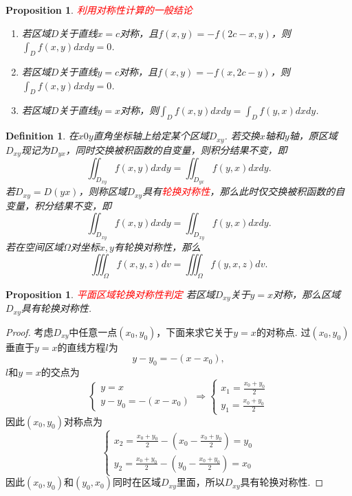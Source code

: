 \documentclass{article}
\newtheorem{proposition}[theorem]{Proposition}
\newtheorem{definition}[theorem]{Definition}
\newcommand{\redt}[1]{\textcolor{red}{#1}}
\begin{document}
\begin{proposition}
\rm \redt{利用对称性计算的一般结论} 
\begin{enumerate}
	\item 若区域$D$关于直线$x = c$对称，且$f(x,y) = -f(2c-x,y)$，则$\int_D f(x,y)dxdy = 0$.
	\item 若区域$D$关于直线$y = c$对称，且$f(x,y) = -f(x,2c-y)$，则$\int_D f(x,y)dxdy = 0$.
	\item 若区域$D$关于直线$y = x$对称，则$\int_D f(x,y)dxdy = \int_D f(y,x)dxdy$.
\end{enumerate}
\end{proposition}

\begin{definition}
\rm 在$x0y$直角坐标轴上给定某个区域$D_{xy}$. 若交换$x$轴和$y$轴，原区域$D_{xy}$现记为$D_{yx}$，同时交换被积函数的自变量，则积分结果不变，即
$$
\iint_{D_{xy}} f(x,y)dxdy = \iint_{D_{yx}} f(y,x)dxdy.
$$ 
若$D_{xy} = D(yx)$，则称区域$D_{xy}$具有\redt{轮换对称性}，那么此时仅交换被积函数的自变量，积分结果不变，即
$$
\iint_{D_{xy}} f(x,y)dxdy = \iint_{D_{xy}} f(y,x)dxdy.
$$
若在空间区域$\Omega$对坐标$x,y$有轮换对称性，那么
$$
\iiint_\Omega f(x,y,z)dv = \iiint_\Omega f(y,x,z)dv.
$$
\end{definition}

\begin{proposition}
\rm \redt{平面区域轮换对称性判定} 若区域$D_{xy}$关于$y = x$对称，那么区域$D_{xy}$具有轮换对称性.
\end{proposition}

\begin{proof}
\rm 考虑$D_{xy}$中任意一点$(x_0,y_0)$，下面来求它关于$y=x$的对称点. 过$(x_0,y_0)$垂直于$y=x$的直线方程$l$为
$$
y-y_0 = -(x-x_0),
$$
$l$和$y=x$的交点为
$$
\left\{
\begin{array}{ll}
y = x\\
y-y_0 = -(x-x_0)
\end{array} \right. \Rightarrow \left\{
\begin{array}{ll}
x_1 = \frac{x_0 + y_0}{2} \\
y_1 = \frac{x_0 + y_0}{2}
\end{array} \right.
$$
因此$(x_0,y_0)$对称点为
$$
\left\{
\begin{array}{ll}
x_2 = \frac{x_0 + y_0}{2} - (x_0 - \frac{x_0 + y_0}{2}) = y_0 \\
y_2 = \frac{x_0 + y_0}{2} - (y_0 - \frac{x_0 + y_0}{2}) = x_0
\end{array} \right.
$$
因此$(x_0,y_0)$和$(y_0,x_0)$同时在区域$D_{xy}$里面，所以$D_{xy}$具有轮换对称性. 
\end{proof}
\end{document}
